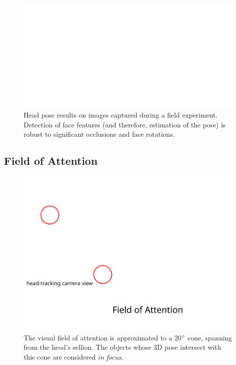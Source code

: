 \documentclass{sig-alternate}
\begin{document}
\begin{figure}[t]
    \centering
    \includegraphics[width=\linewidth]{head_pose_real_world}
    \caption{Head pose results on images captured during a field experiment.
    Detection of face features (and therefore, estimation of the pose) is robust
    to significant occlusions and face rotations.}
    \label{head_pose_real_world}
\end{figure}





\subsection{Field of Attention}

\begin{figure}
    \centering
    \includegraphics[width=0.9\columnwidth]{field_of_attention}
    \caption{\small The visual field of attention is approximated to a
        20$\degree$ cone, spanning from the head's sellion. The objects whose 3D
    pose intersect with this cone are considered \emph{in focus}.}
    \label{rviz}
\end{figure}
\end{document}
